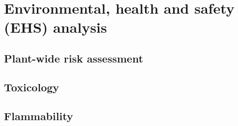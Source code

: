 \section{Environmental, health and safety (EHS) analysis}
\label{sec:ehs}
\subsection{Plant-wide risk assessment}

\subsection{Toxicology}

\subsection{Flammability}